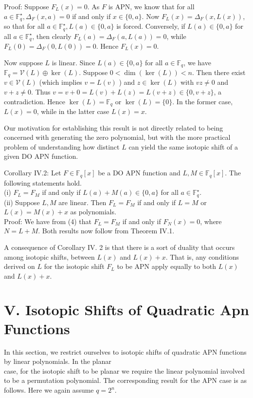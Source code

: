 \documentclass[10pt]{article}
\begin{document}
Proof: Suppose $F_{L}(x)=0$. As $F$ is APN, we know that for all $a \in \mathbb{F}_{q}^{\star}, \Delta_{F}(x, a)=0$ if and only if $x \in\{0, a\}$. Now $F_{L}(x)=\Delta_{F}(x, L(x))$, so that for all $a \in \mathbb{F}_{q}^{\star}, L(a) \in \{0, a\}$ is forced. Conversely, if $L(a) \in\{0, a\}$ for all $a \in \mathbb{F}_{q}^{\star}$, then clearly $F_{L}(a)=\Delta_{F}(a, L(a))=0$, while $F_{L}(0)= \Delta_{F}(0, L(0))=0$. Hence $F_{L}(x)=0$.

Now suppose $L$ is linear. Since $L(a) \in\{0, a\}$ for all $a \in \mathbb{F}_{q}$, we have $\mathbb{F}_{q}=\mathcal{V}(L) \oplus \operatorname{ker}(L)$. Suppose $0<\operatorname{dim}(\operatorname{ker}(L))<n$. Then there exist $v \in \mathcal{V}(L)$ (which implies $v=L(v)$ ) and $z \in \operatorname{ker}(L)$ with $v z \neq 0$ and $v+z \neq 0$. Thus $v=v+0= L(v)+L(z)=L(v+z) \in\{0, v+z\}$, a contradiction. Hence $\operatorname{ker}(L)=\mathbb{F}_{q}$ or $\operatorname{ker}(L)=\{0\}$. In the former case, $L(x)=0$, while in the latter case $L(x)=x$.

Our motivation for establishing this result is not directly related to being concerned with generating the zero polynomial, but with the more practical problem of understanding how distinct $L$ can yield the same isotopic shift of a given DO APN function.

Corollary IV.2: Let $F \in \mathbb{F}_{q}[x]$ be a DO APN function and $L, M \in \mathbb{F}_{q}[x]$. The following statements hold.\\
(i) $F_{L}=F_{M}$ if and only if $L(a)+M(a) \in\{0, a\}$ for all $a \in \mathbb{F}_{q}^{\star}$.\\
(ii) Suppose $L, M$ are linear. Then $F_{L}=F_{M}$ if and only if $L=M$ or $L(x)=M(x)+x$ as polynomials.\\
Proof: We have from (4) that $F_{L}=F_{M}$ if and only if $F_{N}(x)=0$, where $N=L+M$. Both results now follow from Theorem IV.1.

A consequence of Corollary IV. 2 is that there is a sort of duality that occurs among isotopic shifts, between $L(x)$ and $L(x)+x$. That is, any conditions derived on $L$ for the isotopic shift $F_{L}$ to be APN apply equally to both $L(x)$ and $L(x)+x$.

\section*{V. Isotopic Shifts of Quadratic Apn Functions}
In this section, we restrict ourselves to isotopic shifts of quadratic APN functions by linear polynomials. In the planar\\
case, for the isotopic shift to be planar we require the linear polynomial involved to be a permutation polynomial. The corresponding result for the APN case is as follows. Here we again assume $q=2^{n}$.
\end{document}
